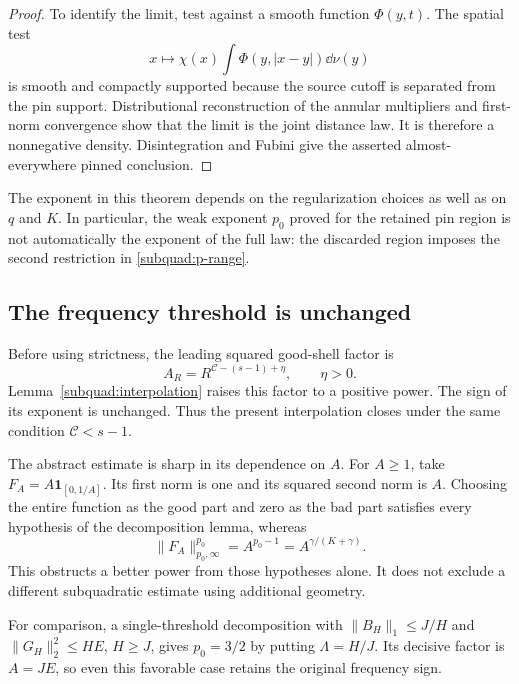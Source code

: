 \begin{proof}
To identify the limit, test against a smooth function \(\Phi(y,t)\).
The spatial test
\[
 x\longmapsto\chi(x)\int\Phi(y,|x-y|)\dd\nu(y)
\]
is smooth and compactly supported because the source cutoff is separated
from the pin support. Distributional reconstruction of the annular
multipliers and first-norm convergence show that the limit is the joint
distance law. It is therefore a nonnegative density. Disintegration and
Fubini give the asserted almost-everywhere pinned conclusion.
\end{proof}

The exponent in this theorem depends on the regularization choices as well
as on \(q\) and \(K\). In particular, the weak exponent \(p_0\) proved
for the retained pin region is not automatically the exponent of the full
law: the discarded region imposes the second restriction in
\eqref{subquad:p-range}.

\subsection{The frequency threshold is unchanged}
Before using strictness, the leading squared good-shell factor is
\[
 A_R=R^{\mathcal C-(s-1)+\eta},\qquad \eta>0.
\]
Lemma~\ref{subquad:interpolation} raises this factor to a positive power.
The sign of its exponent is unchanged. Thus the present interpolation
closes under the same condition \(\mathcal C<s-1\).

The abstract estimate is sharp in its dependence on \(A\). For \(A\ge1\),
take \(F_A=A\mathbf1_{[0,1/A]}\). Its first norm is one and its squared
second norm is \(A\). Choosing the entire function as the good part and
zero as the bad part satisfies every hypothesis of the decomposition lemma,
whereas
\[
 \|F_A\|_{p_0,\infty}^{p_0}=A^{p_0-1}=A^{\gamma/(K+\gamma)}.
\]
This obstructs a better power from those hypotheses alone. It does not
exclude a different subquadratic estimate using additional geometry.

For comparison, a single-threshold decomposition with
\(\|B_H\|_1\le J/H\) and \(\|G_H\|_2^2\le HE\), \(H\ge J\),
gives \(p_0=3/2\) by putting \(\Lambda=H/J\). Its decisive factor is
\(A=JE\), so even this favorable case retains the original frequency sign.

